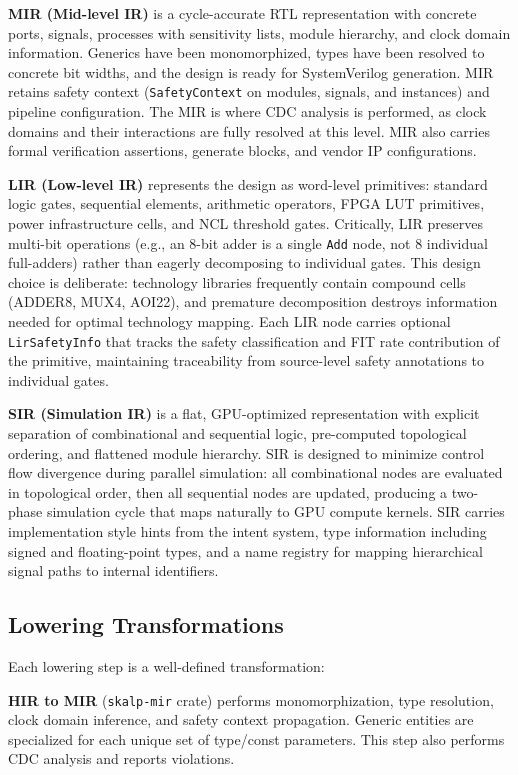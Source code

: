 \documentclass[conference]{IEEEtran}
\begin{document}
\textbf{MIR (Mid-level IR)} is a cycle-accurate RTL representation with concrete ports, signals, processes with sensitivity lists, module hierarchy, and clock domain information. Generics have been monomorphized, types have been resolved to concrete bit widths, and the design is ready for SystemVerilog generation. MIR retains safety context (\texttt{SafetyContext} on modules, signals, and instances) and pipeline configuration. The MIR is where CDC analysis is performed, as clock domains and their interactions are fully resolved at this level. MIR also carries formal verification assertions, generate blocks, and vendor IP configurations.

\textbf{LIR (Low-level IR)} represents the design as word-level primitives: standard logic gates, sequential elements, arithmetic operators, FPGA LUT primitives, power infrastructure cells, and NCL threshold gates. Critically, LIR preserves multi-bit operations (e.g., an 8-bit adder is a single \texttt{Add} node, not 8 individual full-adders) rather than eagerly decomposing to individual gates. This design choice is deliberate: technology libraries frequently contain compound cells (ADDER8, MUX4, AOI22), and premature decomposition destroys information needed for optimal technology mapping. Each LIR node carries optional \texttt{LirSafetyInfo} that tracks the safety classification and FIT rate contribution of the primitive, maintaining traceability from source-level safety annotations to individual gates.

\textbf{SIR (Simulation IR)} is a flat, GPU-optimized representation with explicit separation of combinational and sequential logic, pre-computed topological ordering, and flattened module hierarchy. SIR is designed to minimize control flow divergence during parallel simulation: all combinational nodes are evaluated in topological order, then all sequential nodes are updated, producing a two-phase simulation cycle that maps naturally to GPU compute kernels. SIR carries implementation style hints from the intent system, type information including signed and floating-point types, and a name registry for mapping hierarchical signal paths to internal identifiers.

\subsection{Lowering Transformations}

Each lowering step is a well-defined transformation:

\textbf{HIR to MIR} (\texttt{skalp-mir} crate) performs monomorphization, type resolution, clock domain inference, and safety context propagation. Generic entities are specialized for each unique set of type/const parameters. This step also performs CDC analysis and reports violations.
\end{document}
